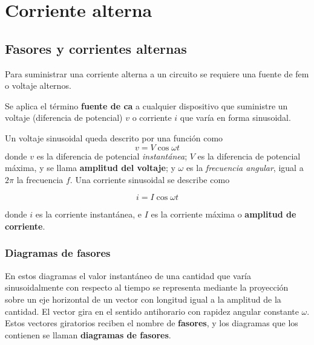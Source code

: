 \chapter{Corriente alterna}
\section{Fasores y corrientes alternas}
Para suministrar una corriente alterna a un circuito se requiere una fuente de fem o voltaje alternos.

Se aplica el término \textbf{fuente de ca} a cualquier dispositivo que suministre un voltaje (diferencia de potencial) $v$ o corriente $i$ que varía en forma sinusoidal.


Un voltaje sinusoidal queda descrito por una función como
\begin{equation}\label{31.1	}
v=V\cos\omega t 
\end{equation}
donde $v$ es la diferencia de potencial \textit{instantánea}; $V$ es la diferencia de potencial máxima, y se llama \textbf{amplitud del voltaje}; y $\omega$ es la \textit{frecuencia angular}, igual a $2\pi$ la frecuencia $f$. Una corriente sinusoidal se describe como

\begin{equation}\label{31.2}
\boxed{i=I\cos\omega t}
\end{equation}

donde $i$ es la corriente instantánea, e $I$ es la corriente máxima o \textbf{amplitud de corriente}.

\subsection{Diagramas de fasores}
En estos diagramas el valor instantáneo de una cantidad que varía sinusoidalmente con respecto al tiempo se representa mediante la proyección sobre un eje horizontal de un vector con longitud igual a la amplitud de la cantidad. El vector gira en el sentido antihorario con rapidez angular constante $\omega$. Estos vectores giratorios reciben el nombre de \textbf{fasores}, y los diagramas que los contienen se llaman \textbf{diagramas de fasores}.


